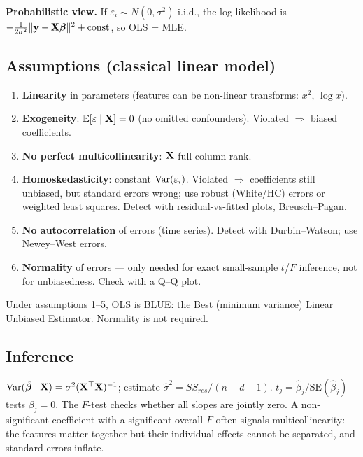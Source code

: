 \textbf{Probabilistic view.} If $\varepsilon_i\sim N(0,\sigma^2)$ i.i.d., the log-likelihood is $-\frac{1}{2\sigma^2}\|\mathbf{y}-\mathbf{X}\bm{\beta}\|^2+\text{const}$, so OLS = MLE.

\subsection{Assumptions (classical linear model)}
\begin{enumerate}
  \item \textbf{Linearity} in parameters (features can be non-linear transforms: $x^2$, $\log x$).
  \item \textbf{Exogeneity}: $\mathbb{E}[\varepsilon\mid\mathbf{X}]=0$ (no omitted confounders). Violated $\Rightarrow$ biased coefficients.
  \item \textbf{No perfect multicollinearity}: $\mathbf{X}$ full column rank.
  \item \textbf{Homoskedasticity}: constant $\operatorname{Var}(\varepsilon_i)$. Violated $\Rightarrow$ coefficients still unbiased, but standard errors wrong; use robust (White/HC) errors or weighted least squares. Detect with residual-vs-fitted plots, Breusch--Pagan.
  \item \textbf{No autocorrelation} of errors (time series). Detect with Durbin--Watson; use Newey--West errors.
  \item \textbf{Normality} of errors --- only needed for exact small-sample $t$/$F$ inference, not for unbiasedness. Check with a Q--Q plot.
\end{enumerate}

\begin{theorem}
Under assumptions 1--5, OLS is BLUE: the Best (minimum variance) Linear Unbiased Estimator. Normality is not required.
\end{theorem}

\subsection{Inference}
$\operatorname{Var}(\hat{\bm{\beta}}\mid\mathbf{X})=\sigma^2(\mathbf{X}^\top\mathbf{X})^{-1}$; estimate $\hat\sigma^2=SS_{res}/(n-d-1)$. $t_j=\hat\beta_j/\text{SE}(\hat\beta_j)$ tests $\beta_j=0$. The $F$-test checks whether all slopes are jointly zero. A non-significant coefficient with a significant overall $F$ often signals multicollinearity: the features matter together but their individual effects cannot be separated, and standard errors inflate.

